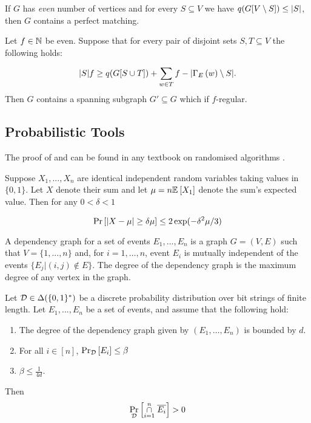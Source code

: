 \documentclass[11pt]{article}
\begin{document}
\begin{lemma}\label{lemma:tutte-criterion}
If $G$ has  \emph{even} number of vertices and for every $S \subseteq V$ we have $q(G[V \setminus S]) \leq |S|$, then $G$ contains a perfect matching.
\end{lemma}

\begin{lemma}\label{lemma:tutte-criterion-factor}
  Let $f \in \mathbb{N}$ be even. Suppose that for every pair of disjoint sets $S, T \subseteq V$ the following holds:

  \[ |S|f \geq q(G[S \cup T]) + \sum_{w \in T} f - |\Gamma_{E}\left(w\right) \setminus S|. \]
  Then $G$ contains a spanning subgraph $G' \subseteq G$ which if $f$-regular.
\end{lemma}



\subsection{Probabilistic Tools}

The proof of  and 
can be found in any textbook on randomised algorithms \citep[See Chapter 1, Chapter 7]{mitzenmacher2017probability}.

\begin{lemma}\label{lemma:mult-chernoff}
Suppose $X_1, ..., X_n$ are identical independent random variables taking values in $\{0, 1\}$. Let $X$ denote their sum and let $\mu = n\mathbb{E}_{}\left[X_1\right]$ denote the sum's expected value. Then for any $0 < \delta < 1$

\[ \Pr\left[|X - \mu| \geq \delta \mu \right] \leq 2\exp(-\delta^2\mu/3)\]

\end{lemma}


A dependency graph for a set of events $E_1, . . . , E_n$ is a graph $G=(V, E)$ such that $V = \{1,.. . , n\}$ and,  for $i= 1,\dots, n$, event $E_i$ is mutually independent
of the events $\{E_j | (i, j) \notin E\}$. The degree of the dependency graph is the maximum degree of any vertex in the graph.


\begin{lemma}\label{lemma:lll}Let $\mathcal{D} \in \Delta(\{0,1\}^*)$ be a discrete probability distribution over bit strings of finite length.
  Let $E_1,...,E_n$ be a set of events, and assume that the following hold:
\begin{enumerate}
\item The degree of the dependency graph given by $(E_1, \dots, E_n)$ is bounded by $d$.

\item For all $i \in [n]$, $\Pr_{\mathcal{D}}\left[E_i \right] \leq \beta$

\item $\beta \leq \frac{1}{4d}$.
\end{enumerate}
Then
\[ \Pr_{\mathcal{D}}\left[\overset{n}{ \underset{i=1}{\cap}} \hspace{0.1cm}  \overline{E_i} \right] > 0\]


\end{lemma}
\end{document}

